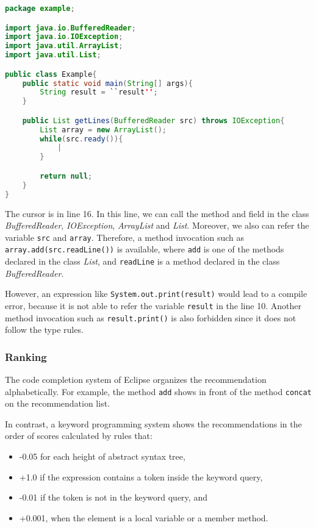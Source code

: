 \documentclass[PRO,english]{ipsj}
\begin{document}
\begin{lstlisting}[language=Java]
package example;

import java.io.BufferedReader;
import java.io.IOException;
import java.util.ArrayList;
import java.util.List;

public class Example{
    public static void main(String[] args){
        String result = ``result'';
    }

    public List getLines(BufferedReader src) throws IOException{
        List array = new ArrayList();
        while(src.ready()){
            |
        }

        return null;
    }
}
\end{lstlisting}

The cursor is in line 16. In this line, we can call the method and field in the class \textit{BufferedReader}, \textit{IOException}, \textit{ArrayList} and \textit{List}. Moreover, we also can refer the variable \texttt{src} and \texttt{array}. Therefore, a method invocation such as \texttt{array.add(src.readLine())} is available, where \texttt{add} is one of the methods declared in the class \textit{List}, and \texttt{readLine} is a method declared in the class \textit{BufferedReader}. 

However, an expression like \texttt{System.out.print(result)} would lead to a compile error, because it is not able to refer the variable \texttt{result} in the line 10. Another method invocation such as \texttt{result.print()} is also forbidden since it does not follow the type rules.


\subsubsection{Ranking}
\label{subsubsection:Ranking}
The code completion system of Eclipse organizes the recommendation alphabetically. For example, the method \texttt{add} shows in front of the method \texttt{concat} on the recommendation list.

In contrast, a keyword programming system shows the recommendations in the order of scores calculated by rules that:
\begin{itemize}
\item -0.05 for each height of abstract syntax tree,
\item +1.0 if the expression contains a token inside the keyword query,
\item -0.01 if the token is not in the keyword query, and
\item +0.001, when the element is a local variable or a member method.
\end{itemize}
\end{document}
